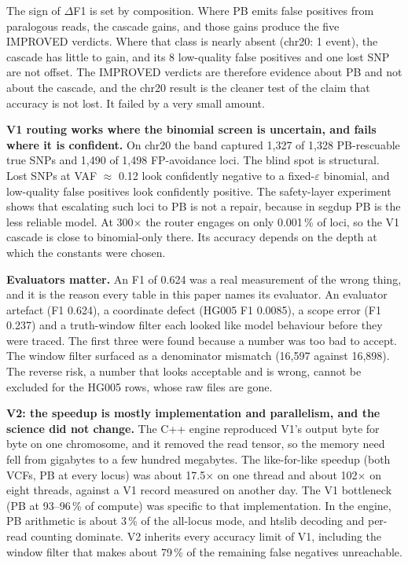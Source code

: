\documentclass[11pt,a4paper]{article}
\begin{document}
The sign of $\Delta$F1 is set by composition. Where PB emits false positives from paralogous reads, the cascade gains, and those gains produce the five IMPROVED verdicts. Where that class is nearly absent (chr20: 1 event), the cascade has little to gain, and its 8 low-quality false positives and one lost SNP are not offset. The IMPROVED verdicts are therefore evidence about PB and not about the cascade, and the chr20 result is the cleaner test of the claim that accuracy is not lost. It failed by a very small amount.

\textbf{V1 routing works where the binomial screen is uncertain, and fails where it is confident.} On chr20 the band captured 1,327 of 1,328 PB-rescuable true SNPs and 1,490 of 1,498 FP-avoidance loci. The blind spot is structural. Lost SNPs at VAF $\approx$ 0.12 look confidently negative to a fixed-$\varepsilon$ binomial, and low-quality false positives look confidently positive. The safety-layer experiment shows that escalating such loci to PB is not a repair, because in segdup PB is the less reliable model. At 300$\times$ the router engages on only 0.001\,\% of loci, so the V1 cascade is close to binomial-only there. Its accuracy depends on the depth at which the constants were chosen.

\textbf{Evaluators matter.} An F1 of 0.624 was a real measurement of the wrong thing, and it is the reason every table in this paper names its evaluator. An evaluator artefact (F1 0.624), a coordinate defect (HG005 F1 0.0085), a scope error (F1 0.237) and a truth-window filter each looked like model behaviour before they were traced. The first three were found because a number was too bad to accept. The window filter surfaced as a denominator mismatch (16,597 against 16,898). The reverse risk, a number that looks acceptable and is wrong, cannot be excluded for the HG005 rows, whose raw files are gone.

\textbf{V2: the speedup is mostly implementation and parallelism, and the science did not change.} The C++ engine reproduced V1's output byte for byte on one chromosome, and it removed the read tensor, so the memory need fell from gigabytes to a few hundred megabytes. The like-for-like speedup (both VCFs, PB at every locus) was about 17.5$\times$ on one thread and about 102$\times$ on eight threads, against a V1 record measured on another day. The V1 bottleneck (PB at 93--96\,\% of compute) was specific to that implementation. In the engine, PB arithmetic is about 3\,\% of the all-locus mode, and htslib decoding and per-read counting dominate. V2 inherits every accuracy limit of V1, including the window filter that makes about 79\,\% of the remaining false negatives unreachable.
\end{document}
